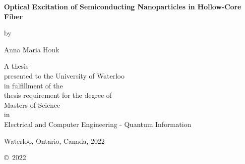 \pagestyle{empty}

\begin{titlepage}
        \begin{center}
        \vspace*{1.0cm}

        \Huge
        {\bf Optical Excitation of Semiconducting Nanoparticles in Hollow-Core Fiber}

        \vspace*{1.0cm}

        \normalsize
        by \\

        \vspace*{1.0cm}

        \Large
        Anna Maria Houk\\

        \vspace*{3.0cm}

        \normalsize
        A thesis \\
        presented to the University of Waterloo \\ 
        in fulfillment of the \\
        thesis requirement for the degree of \\
        Masters of Science \\
        in \\
        Electrical and Computer Engineering - Quantum Information  \\

        \vspace*{2.0cm}

        Waterloo, Ontario, Canada, 2022 \\

        \vspace*{1.0cm}

        \copyright\  2022 \\
        \end{center}
\end{titlepage}

\pagestyle{plain}
\setcounter{page}{2}

